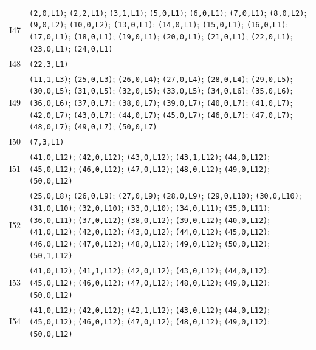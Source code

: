 {\begin{longtable}{@{}r p{14.7cm}@{}}
I47 & \texttt{(2,0,L1)}; \texttt{(2,2,L1)}; \texttt{(3,1,L1)}; \texttt{(5,0,L1)}; \texttt{(6,0,L1)}; \texttt{(7,0,L1)}; \texttt{(8,0,L2)}; \texttt{(9,0,L2)}; \texttt{(10,0,L2)}; \texttt{(13,0,L1)}; \texttt{(14,0,L1)}; \texttt{(15,0,L1)}; \texttt{(16,0,L1)}; \texttt{(17,0,L1)}; \texttt{(18,0,L1)}; \texttt{(19,0,L1)}; \texttt{(20,0,L1)}; \texttt{(21,0,L1)}; \texttt{(22,0,L1)}; \texttt{(23,0,L1)}; \texttt{(24,0,L1)}\\\addlinespace[3pt]
I48 & \texttt{(22,3,L1)}\\\addlinespace[3pt]
I49 & \texttt{(11,1,L3)}; \texttt{(25,0,L3)}; \texttt{(26,0,L4)}; \texttt{(27,0,L4)}; \texttt{(28,0,L4)}; \texttt{(29,0,L5)}; \texttt{(30,0,L5)}; \texttt{(31,0,L5)}; \texttt{(32,0,L5)}; \texttt{(33,0,L5)}; \texttt{(34,0,L6)}; \texttt{(35,0,L6)}; \texttt{(36,0,L6)}; \texttt{(37,0,L7)}; \texttt{(38,0,L7)}; \texttt{(39,0,L7)}; \texttt{(40,0,L7)}; \texttt{(41,0,L7)}; \texttt{(42,0,L7)}; \texttt{(43,0,L7)}; \texttt{(44,0,L7)}; \texttt{(45,0,L7)}; \texttt{(46,0,L7)}; \texttt{(47,0,L7)}; \texttt{(48,0,L7)}; \texttt{(49,0,L7)}; \texttt{(50,0,L7)}\\\addlinespace[3pt]
I50 & \texttt{(7,3,L1)}\\\addlinespace[3pt]
I51 & \texttt{(41,0,L12)}; \texttt{(42,0,L12)}; \texttt{(43,0,L12)}; \texttt{(43,1,L12)}; \texttt{(44,0,L12)}; \texttt{(45,0,L12)}; \texttt{(46,0,L12)}; \texttt{(47,0,L12)}; \texttt{(48,0,L12)}; \texttt{(49,0,L12)}; \texttt{(50,0,L12)}\\\addlinespace[3pt]
I52 & \texttt{(25,0,L8)}; \texttt{(26,0,L9)}; \texttt{(27,0,L9)}; \texttt{(28,0,L9)}; \texttt{(29,0,L10)}; \texttt{(30,0,L10)}; \texttt{(31,0,L10)}; \texttt{(32,0,L10)}; \texttt{(33,0,L10)}; \texttt{(34,0,L11)}; \texttt{(35,0,L11)}; \texttt{(36,0,L11)}; \texttt{(37,0,L12)}; \texttt{(38,0,L12)}; \texttt{(39,0,L12)}; \texttt{(40,0,L12)}; \texttt{(41,0,L12)}; \texttt{(42,0,L12)}; \texttt{(43,0,L12)}; \texttt{(44,0,L12)}; \texttt{(45,0,L12)}; \texttt{(46,0,L12)}; \texttt{(47,0,L12)}; \texttt{(48,0,L12)}; \texttt{(49,0,L12)}; \texttt{(50,0,L12)}; \texttt{(50,1,L12)}\\\addlinespace[3pt]
I53 & \texttt{(41,0,L12)}; \texttt{(41,1,L12)}; \texttt{(42,0,L12)}; \texttt{(43,0,L12)}; \texttt{(44,0,L12)}; \texttt{(45,0,L12)}; \texttt{(46,0,L12)}; \texttt{(47,0,L12)}; \texttt{(48,0,L12)}; \texttt{(49,0,L12)}; \texttt{(50,0,L12)}\\\addlinespace[3pt]
I54 & \texttt{(41,0,L12)}; \texttt{(42,0,L12)}; \texttt{(42,1,L12)}; \texttt{(43,0,L12)}; \texttt{(44,0,L12)}; \texttt{(45,0,L12)}; \texttt{(46,0,L12)}; \texttt{(47,0,L12)}; \texttt{(48,0,L12)}; \texttt{(49,0,L12)}; \texttt{(50,0,L12)}\\\addlinespace[3pt]

\end{longtable}}
